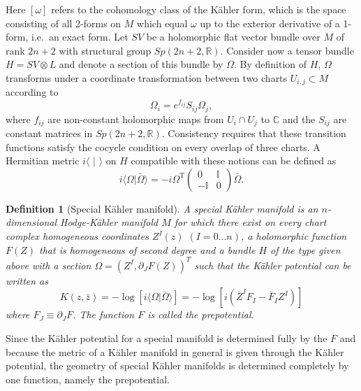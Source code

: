 \documentclass[12pt,twoside]{book}
\newtheorem{definition}{Definition}[chapter]
\begin{document}
\noindent
Here $[\omega]$ refers to the cohomology class of the K\"ahler form, which is the space consisting of all 2-forms on $M$ which equal $\omega$ up to the exterior derivative of a 1-form, i.e.\ an exact form.
Let $SV$ be a holomorphic flat vector bundle over $M$ of rank $2n+2$ with structural group $Sp(2n+2,\mathbb{R})$. Consider now a tensor bundle $H = SV\otimes L$ and denote a section of this bundle by $\Omega$. By definition of $H$, $\Omega$ transforms under a coordinate transformation between two charts $U_{i,j}\subset M$ according to
\begin{equation}
\Omega_{i}=e^{f_{ij}}S_{ij}\Omega_{j},
\end{equation}where $f_{ij}$ are non-constant holomorphic maps from $U_{i}\cap U_{j}$ to $\mathbb{C}$ and the $S_{ij}$ are constant matrices in $Sp(2n+2,\mathbb{R})$. Consistency requires that these transition functions satisfy the cocycle condition on every overlap of three charts. A Hermitian metric $i\langle\,\,|\,\,\rangle$ on $H$ compatible with these notions can be defined as
\begin{equation}
i\langle\Omega|\bar{\Omega}\rangle = -i\Omega^{\mathrm{T}}
\begin{pmatrix}
0 & \mathbb{I}\\
-\mathbb{I} & 0
\end{pmatrix}\bar{\Omega}.
\end{equation}

\begin{definition}[Special K\"ahler manifold]\label{def:specialK}
A special K\"ahler manifold is an $n$-dimen\-sional Hodge-K\"ahler manifold $M$ for which there exist on every chart complex homogeneous coordinates $Z^{I}(z)$ $(I=0\ldots n)$, a holomorphic function $F(Z)$ that is homogeneous of second degree and a bundle $H$ of the type given above with a section $\Omega = \left(Z^{I},\partial_{J}F(Z)\right)^{T}$ such that the K\"ahler potential can be written as
\begin{equation}\label{eq:specialK}
K(z,\bar{z}) = -\log\left[i\langle\Omega | \bar{\Omega}\rangle\right]=-\log\left[i(\bar{Z}^{I}F_{I}-\bar{F}_{I}Z^{I})\right]
\end{equation}where $F_{J}\equiv\partial_{J}F$. The function $F$ is called the prepotential.
\end{definition}

\noindent
Since the K\"ahler potential for a special manifold is determined fully by the $F$ and because the metric of a K\"ahler manifold in general is given through the K\"ahler potential, the geometry of special K\"ahler manifolds is determined completely by one function, namely the prepotential.
\end{document}

